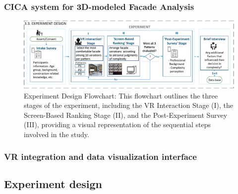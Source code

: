 \documentclass[final,5p,times]{elsarticle}%
\begin{document}
\begin{linenumbers}
    \subsubsection{CICA system for 3D-modeled Facade Analysis}
    \label{subsubsec:CICAfor3DmodeledFacades}
    

    \begin{figure}[htb]
        \centering
        \includegraphics[width= \linewidth]{Images/FlowchartExperiment}
          \caption{Experiment Design Flowchart: This flowchart outlines the three stages of the experiment, including the VR Interaction Stage (I), the Screen-Based Ranking Stage (II), and the Post-Experiment Survey (III), providing a visual representation of the sequential steps involved in the study.}
          \label{fig:ExperimentFlowchart}
    \end{figure}

    \subsubsection{VR integration and data visualization interface}
    \label{subsubsec:VR_integration}
    

    \subsection{Experiment design}
    \label{subsec:Experiment_design}
    



\end{linenumbers}
\end{document}
